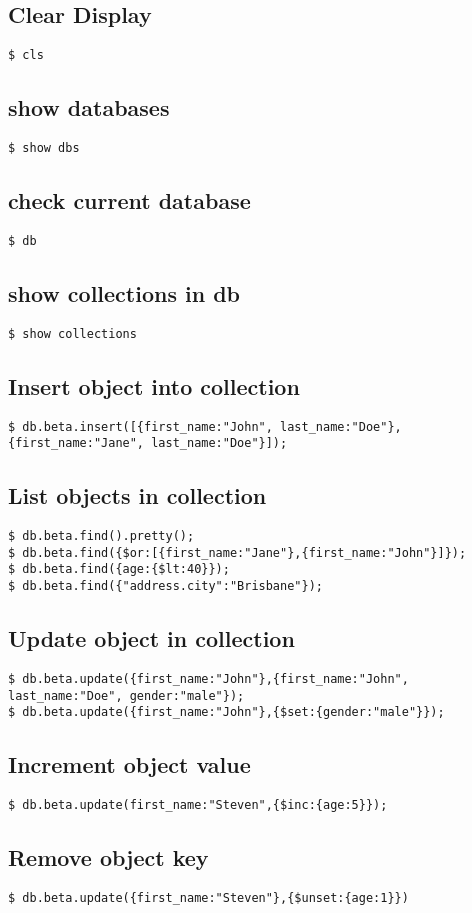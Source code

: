 \documentclass{article}
\begin{document}
\begin{multicols}{3}
\subsection{Clear Display}
\lstinline|$ cls|
\subsection{show databases}
\lstinline|$ show dbs|
\subsection{check current database}
\lstinline|$ db|
\subsection{show collections in db}
\lstinline|$ show collections|
\subsection{Insert object into collection}
\lstinline|$ db.beta.insert([{first_name:"John", last_name:"Doe"},{first_name:"Jane", last_name:"Doe"}]);|
\subsection{List objects in collection}
\lstinline|$ db.beta.find().pretty();|\\
\lstinline|$ db.beta.find({$or:[{first_name:"Jane"},{first_name:"John"}]});|\\
\lstinline|$ db.beta.find({age:{$lt:40}});|\\
\lstinline|$ db.beta.find({"address.city":"Brisbane"});|\\
\subsection{Update object in collection}
\lstinline|$ db.beta.update({first_name:"John"},{first_name:"John", last_name:"Doe", gender:"male"});|\\
\lstinline|$ db.beta.update({first_name:"John"},{$set:{gender:"male"}});|
\subsection{Increment object value}
\lstinline|$ db.beta.update(first_name:"Steven",{$inc:{age:5}});|
\subsection{Remove object key}
\lstinline|$ db.beta.update({first_name:"Steven"},{$unset:{age:1}})|

\end{multicols}
\end{document}
